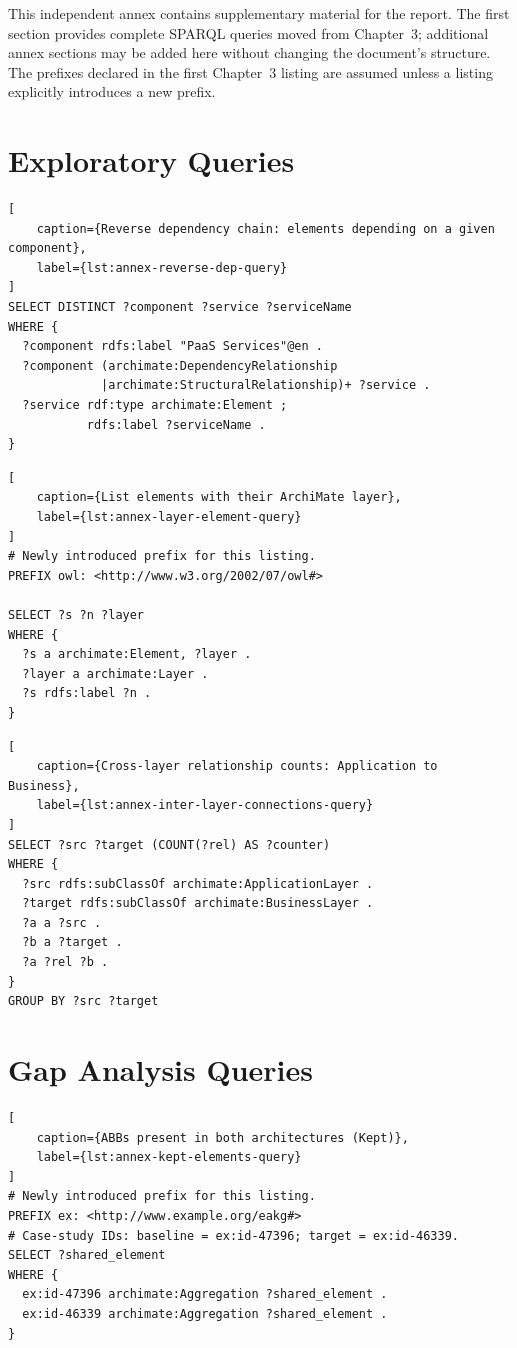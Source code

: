 This independent annex contains supplementary material for the report. The first section provides complete SPARQL queries moved from Chapter~3; additional annex sections may be added here without changing the document's structure. The prefixes declared in the first Chapter~3 listing are assumed unless a listing explicitly introduces a new prefix.

\section{Exploratory Queries}
\label{sec:annex-a1}

\begin{lstlisting}[
	caption={Reverse dependency chain: elements depending on a given component},
	label={lst:annex-reverse-dep-query}
]
SELECT DISTINCT ?component ?service ?serviceName
WHERE {
  ?component rdfs:label "PaaS Services"@en .
  ?component (archimate:DependencyRelationship
             |archimate:StructuralRelationship)+ ?service .
  ?service rdf:type archimate:Element ;
           rdfs:label ?serviceName .
}
\end{lstlisting}

\begin{lstlisting}[
	caption={List elements with their ArchiMate layer},
	label={lst:annex-layer-element-query}
]
# Newly introduced prefix for this listing.
PREFIX owl: <http://www.w3.org/2002/07/owl#>

SELECT ?s ?n ?layer
WHERE {
  ?s a archimate:Element, ?layer .
  ?layer a archimate:Layer .
  ?s rdfs:label ?n .
}
\end{lstlisting}

\begin{lstlisting}[
	caption={Cross-layer relationship counts: Application to Business},
	label={lst:annex-inter-layer-connections-query}
]
SELECT ?src ?target (COUNT(?rel) AS ?counter)
WHERE {
  ?src rdfs:subClassOf archimate:ApplicationLayer .
  ?target rdfs:subClassOf archimate:BusinessLayer .
  ?a a ?src .
  ?b a ?target .
  ?a ?rel ?b .
}
GROUP BY ?src ?target
\end{lstlisting}

\section{Gap Analysis Queries}
\label{sec:annex-a2}

\begin{lstlisting}[
	caption={ABBs present in both architectures (Kept)},
	label={lst:annex-kept-elements-query}
]
# Newly introduced prefix for this listing.
PREFIX ex: <http://www.example.org/eakg#>
# Case-study IDs: baseline = ex:id-47396; target = ex:id-46339.
SELECT ?shared_element
WHERE {
  ex:id-47396 archimate:Aggregation ?shared_element .
  ex:id-46339 archimate:Aggregation ?shared_element .
}
\end{lstlisting}

